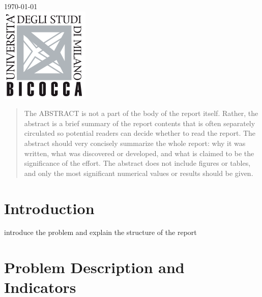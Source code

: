 \begin{titlepage}

{\large \today}\\[2cm] %


\includegraphics{figs/logo.png}\\[1cm] %
 

\vfill %

\end{titlepage}


\begin{abstract}
The ABSTRACT is not a part of the body of the report itself. Rather, the abstract is a brief summary of the report contents that is often separately circulated so potential readers can decide whether to read the report. The abstract should very concisely summarize the whole report: why it was written, what was discovered or developed, and what is claimed to be the significance of the effort. The abstract does not include figures or tables, and only the most significant numerical values or results should be given.
\end{abstract}

\section*{Introduction}
introduce the problem and explain the structure of the report

\section{Problem Description and Indicators}

